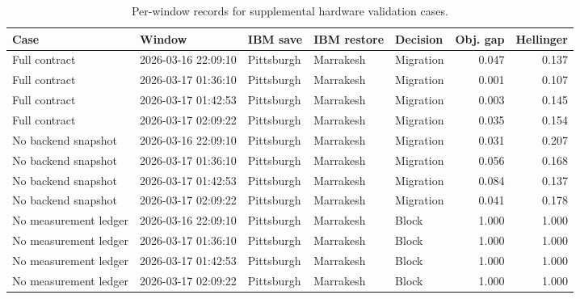 \begin{table}[t]
\centering
{}
\begin{tabular}{lllllrr}
\toprule
Case & Window & IBM save & IBM restore & Decision & Obj. gap & Hellinger \\
\midrule
Full contract & 2026-03-16 22:09:10 & Pittsburgh & Marrakesh & Migration & 0.047 & 0.137 \\
Full contract & 2026-03-17 01:36:10 & Pittsburgh & Marrakesh & Migration & 0.001 & 0.107 \\
Full contract & 2026-03-17 01:42:53 & Pittsburgh & Marrakesh & Migration & 0.003 & 0.145 \\
Full contract & 2026-03-17 02:09:22 & Pittsburgh & Marrakesh & Migration & 0.035 & 0.154 \\
No backend snapshot & 2026-03-16 22:09:10 & Pittsburgh & Marrakesh & Migration & 0.031 & 0.207 \\
No backend snapshot & 2026-03-17 01:36:10 & Pittsburgh & Marrakesh & Migration & 0.056 & 0.168 \\
No backend snapshot & 2026-03-17 01:42:53 & Pittsburgh & Marrakesh & Migration & 0.084 & 0.137 \\
No backend snapshot & 2026-03-17 02:09:22 & Pittsburgh & Marrakesh & Migration & 0.041 & 0.178 \\
No measurement ledger & 2026-03-16 22:09:10 & Pittsburgh & Marrakesh & Block & 1.000 & 1.000 \\
No measurement ledger & 2026-03-17 01:36:10 & Pittsburgh & Marrakesh & Block & 1.000 & 1.000 \\
No measurement ledger & 2026-03-17 01:42:53 & Pittsburgh & Marrakesh & Block & 1.000 & 1.000 \\
No measurement ledger & 2026-03-17 02:09:22 & Pittsburgh & Marrakesh & Block & 1.000 & 1.000 \\
\bottomrule
\end{tabular}
\caption{Per-window records for supplemental hardware validation cases.}
\label{tab:supplemental\_hw\_window\_records}
\end{table}
